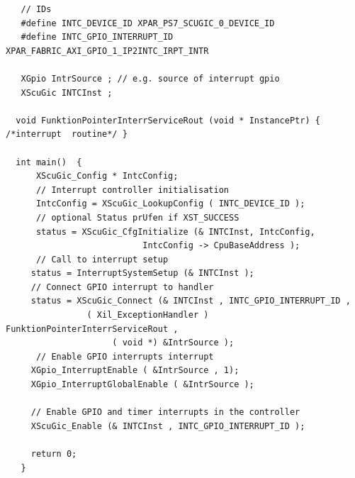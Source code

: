  
\begin{verbatim}
   // IDs
   #define INTC_DEVICE_ID XPAR_PS7_SCUGIC_0_DEVICE_ID
   #define INTC_GPIO_INTERRUPT_ID XPAR_FABRIC_AXI_GPIO_1_IP2INTC_IRPT_INTR
 	
   XGpio IntrSource ; // e.g. source of interrupt gpio
   XScuGic INTCInst ;
   
  void FunktionPointerInterrServiceRout (void * InstancePtr) { /*interrupt  routine*/ }

  int main()  {
      XScuGic_Config * IntcConfig;
      // Interrupt controller initialisation
      IntcConfig = XScuGic_LookupConfig ( INTC_DEVICE_ID );
      // optional Status prUfen if XST_SUCCESS
      status = XScuGic_CfgInitialize (& INTCInst, IntcConfig,
                           IntcConfig -> CpuBaseAddress );
      // Call to interrupt setup       
     status = InterruptSystemSetup (& INTCInst );
     // Connect GPIO interrupt to handler
     status = XScuGic_Connect (& INTCInst , INTC_GPIO_INTERRUPT_ID ,
                ( Xil_ExceptionHandler ) FunktionPointerInterrServiceRout ,
                     ( void *) &IntrSource );
      // Enable GPIO interrupts interrupt
     XGpio_InterruptEnable ( &IntrSource , 1);
     XGpio_InterruptGlobalEnable ( &IntrSource );

     // Enable GPIO and timer interrupts in the controller
     XScuGic_Enable (& INTCInst , INTC_GPIO_INTERRUPT_ID );

     return 0;
   }
 \end{verbatim}